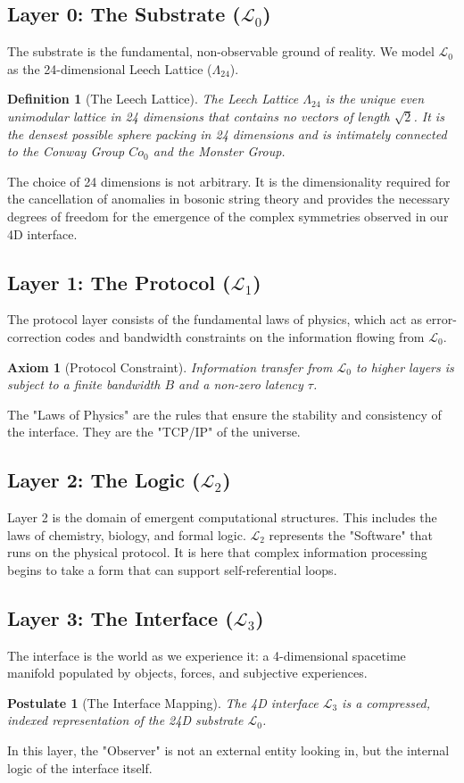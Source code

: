 \documentclass[11pt,onecolumn]{article}
\newcommand{\substrate}{\mathcal{L}_0}
\newcommand{\protocol}{\mathcal{L}_1}
\newcommand{\logic}{\mathcal{L}_2}
\newcommand{\interface}{\mathcal{L}_3}
\newcommand{\leech}{\Lambda_{24}}
\newcommand{\conway}{Co_0}
\newtheorem{definition}{Definition}
\newtheorem{axiom}{Axiom}
\newtheorem{postulate}{Postulate}
\begin{document}
\subsection{Layer 0: The Substrate ($\substrate$)}
The substrate is the fundamental, non-observable ground of reality. We model $\substrate$ as the 24-dimensional Leech Lattice ($\leech$). 
\begin{definition}[The Leech Lattice]
The Leech Lattice $\leech$ is the unique even unimodular lattice in 24 dimensions that contains no vectors of length $\sqrt{2}$. It is the densest possible sphere packing in 24 dimensions and is intimately connected to the Conway Group $\conway$ and the Monster Group.
\end{definition}
The choice of 24 dimensions is not arbitrary. It is the dimensionality required for the cancellation of anomalies in bosonic string theory and provides the necessary degrees of freedom for the emergence of the complex symmetries observed in our 4D interface.

\subsection{Layer 1: The Protocol ($\protocol$)}
The protocol layer consists of the fundamental laws of physics, which act as error-correction codes and bandwidth constraints on the information flowing from $\substrate$. 
\begin{axiom}[Protocol Constraint]
Information transfer from $\substrate$ to higher layers is subject to a finite bandwidth $B$ and a non-zero latency $\tau$.
\end{axiom}
The "Laws of Physics" are the rules that ensure the stability and consistency of the interface. They are the "TCP/IP" of the universe.

\subsection{Layer 2: The Logic ($\logic$)}
Layer 2 is the domain of emergent computational structures. This includes the laws of chemistry, biology, and formal logic. $\logic$ represents the "Software" that runs on the physical protocol. It is here that complex information processing begins to take a form that can support self-referential loops.

\subsection{Layer 3: The Interface ($\interface$)}
The interface is the world as we experience it: a 4-dimensional spacetime manifold populated by objects, forces, and subjective experiences. 
\begin{postulate}[The Interface Mapping]
The 4D interface $\interface$ is a compressed, indexed representation of the 24D substrate $\substrate$.
\end{postulate}
In this layer, the "Observer" is not an external entity looking in, but the internal logic of the interface itself.
\end{document}
